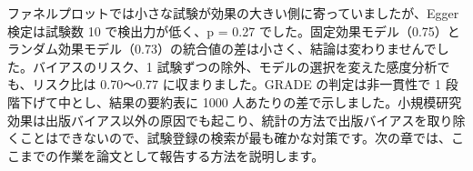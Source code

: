 ファネルプロットでは小さな試験が効果の大きい側に寄っていましたが、Egger 検定は試験数 10 で検出力が低く、p = 0.27 でした。固定効果モデル（0.75）とランダム効果モデル（0.73）の統合値の差は小さく、結論は変わりませんでした。バイアスのリスク、1 試験ずつの除外、モデルの選択を変えた感度分析でも、リスク比は 0.70〜0.77 に収まりました。GRADE の判定は非一貫性で 1 段階下げて中とし、結果の要約表に 1000 人あたりの差で示しました。小規模研究効果は出版バイアス以外の原因でも起こり、統計の方法で出版バイアスを取り除くことはできないので、試験登録の検索が最も確かな対策です。次の章では、ここまでの作業を論文として報告する方法を説明します。
